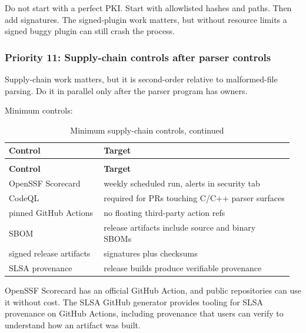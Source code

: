 \documentclass[../main.tex]{subfiles}
\begin{document}
Do not start with a perfect PKI. Start with allowlisted hashes and paths.
Then add signatures. The signed-plugin work matters, but without resource limits
a signed buggy plugin can still crash the process.

\subsubsection*{Priority 11: Supply-chain controls after parser controls}

Supply-chain work matters, but it is second-order relative to malformed-file parsing. Do it in parallel only after the parser program has owners.

Minimum controls:

\begingroup
\small
\setlength{\tabcolsep}{3pt}
\renewcommand{\arraystretch}{1.15}

\begin{longtable}{@{}p{0.32\linewidth}p{0.64\linewidth}@{}}
\caption{Minimum supply-chain controls}
\label{tab:minimum-supply-chain-controls}\\
\hline
\textbf{Control} & \textbf{Target} \\
\hline
\endfirsthead

\caption[]{Minimum supply-chain controls, continued}\\
\hline
\textbf{Control} & \textbf{Target} \\
\hline
\endhead

\hline
\endfoot

\hline
\endlastfoot

OpenSSF Scorecard & weekly scheduled run, alerts in security tab \\
CodeQL & required for PRs touching C/C++ parser surfaces \\
pinned GitHub Actions & no floating third-party action refs \\
SBOM & release artifacts include source and binary SBOMs \\
signed release artifacts & signatures plus checksums \\
SLSA provenance & release builds produce verifiable provenance \\
\end{longtable}
\endgroup

OpenSSF Scorecard has an official GitHub Action, and public repositories can use
it without cost. The SLSA GitHub generator provides tooling for SLSA provenance
on GitHub Actions, including provenance that users can verify to understand how
an artifact was built.
\end{document}

